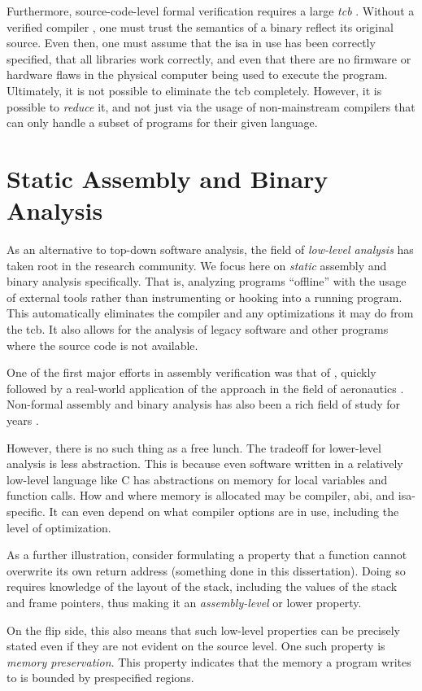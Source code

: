 Furthermore, source-code-level formal verification requires a large \emph{\ac{tcb}}
\autocites[270]{lampson1992authentication}{orange-book}[13]{rushby1981dvss}.
Without a verified compiler \autocite{leroy:compcert}, one must trust the semantics of a binary reflect its original source.
Even then, one must assume that the \ac{isa} in use has been correctly specified, that all libraries work correctly, and even that there are no firmware or hardware flaws in the physical computer being used to execute the program.
Ultimately, it is not possible to eliminate the \ac{tcb} completely.
However, it is possible to \emph{reduce} it, and not just via the usage of non-mainstream compilers that can only handle a subset of programs for their given language.

\section{Static Assembly and Binary Analysis}
As an alternative to top-down software analysis, the field of \emph{low-level analysis} has taken root in the research community.
We focus here on \emph{static} assembly and binary analysis specifically.
That is, analyzing programs ``offline'' with the usage of external tools rather than instrumenting or hooking into a running program.
This automatically eliminates the compiler and any optimizations it may do from the \ac{tcb}.
It also allows for the analysis of legacy software and other programs where the source code is not available.

One of the first major efforts in assembly verification was that of \textcite{clutterbuck1986validation,clutterbuck1988verification}, quickly followed by a real-world application of the approach in the field of aeronautics \autocite{oneill1988verification}.
Non-formal assembly and binary analysis has also been a rich field of study for years \autocite{kruegel2005automating,brumley2011bap,wang2017angr}.

However, there is no such thing as a free lunch.
The tradeoff for lower-level analysis is less abstraction.
This is because even software written in a relatively low-level language like C has abstractions on memory for local variables and function calls.
How and where memory is allocated may be compiler, \ac{abi}, and \ac{isa}-specific.
It can even depend on what compiler options are in use, including the level of optimization.
\begin{example}\label{ex:rop}
  As a further illustration, consider formulating a property that a function cannot overwrite its own return address (something done in this dissertation).
  Doing so requires knowledge of the layout of the stack, including the values of the stack and frame pointers, thus making it an \emph{assembly-level} or lower property.
\end{example}
On the flip side, this also means that such low-level properties can be precisely stated even if they are not evident on the source level.
One such property is \emph{memory preservation}.
This property indicates that the memory a program writes to is bounded by prespecified regions.

